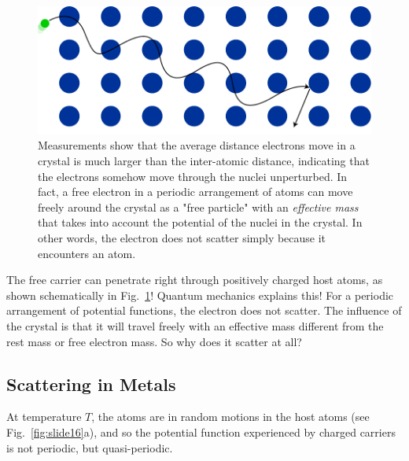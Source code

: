 \begin{figure}
\begin{center}
\includegraphics[width=.75\columnwidth]{crystal_blochwave}
\end{center}
\caption{Measurements show that the average distance electrons move in a crystal is much larger than the inter-atomic distance, indicating that the electrons somehow move through the nuclei unperturbed.  In fact, a free electron in a periodic arrangement of atoms can move freely around the crystal as a "free particle" with an \emph{effective mass} that takes into account the potential of the nuclei in the crystal.  In other words, the electron does not scatter simply because it encounters an atom. } \label{fig:slide15}
\end{figure}


 The free carrier can penetrate right through positively charged host atoms, as shown schematically in Fig.~\ref{fig:slide15}!  Quantum mechanics explains this!  For a periodic arrangement of potential functions, the electron does not scatter. The influence of the crystal is that it will travel freely with an effective mass different from the rest mass or free electron mass.   So why does it scatter at all?


\subsection{Scattering in Metals}


At temperature $T$, the atoms are in random motions in the host atoms (see Fig.~\ref{fig:slide16}a), and so the potential function experienced by charged carriers is not periodic, but quasi-periodic. 


